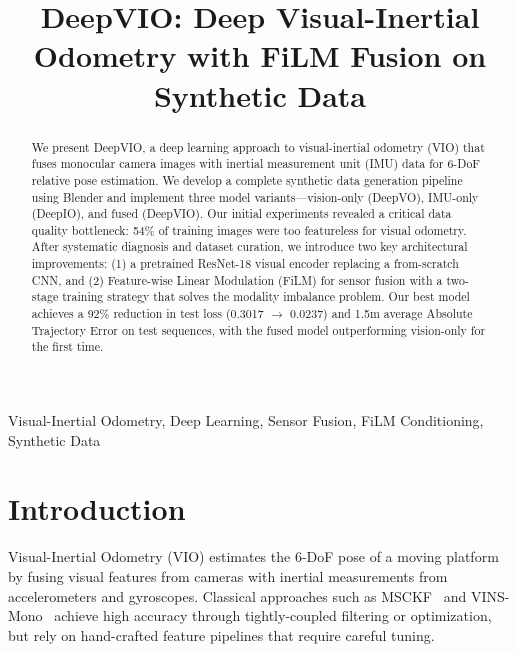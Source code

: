 \documentclass[conference]{IEEEtran}
\begin{document}
\title{DeepVIO: Deep Visual-Inertial Odometry with FiLM Fusion on Synthetic Data}

\author{
}

\maketitle

\begin{abstract}
We present DeepVIO, a deep learning approach to visual-inertial odometry (VIO) that fuses monocular camera images with inertial measurement unit (IMU) data for 6-DoF relative pose estimation. We develop a complete synthetic data generation pipeline using Blender and implement three model variants---vision-only (DeepVO), IMU-only (DeepIO), and fused (DeepVIO). Our initial experiments revealed a critical data quality bottleneck: 54\% of training images were too featureless for visual odometry. After systematic diagnosis and dataset curation, we introduce two key architectural improvements: (1) a pretrained ResNet-18 visual encoder replacing a from-scratch CNN, and (2) Feature-wise Linear Modulation (FiLM) for sensor fusion with a two-stage training strategy that solves the modality imbalance problem. Our best model achieves a 92\% reduction in test loss (0.3017 $\to$ 0.0237) and 1.5m average Absolute Trajectory Error on test sequences, with the fused model outperforming vision-only for the first time.
\end{abstract}

\begin{IEEEkeywords}
Visual-Inertial Odometry, Deep Learning, Sensor Fusion, FiLM Conditioning, Synthetic Data
\end{IEEEkeywords}

\section{Introduction}

Visual-Inertial Odometry (VIO) estimates the 6-DoF pose of a moving platform by fusing visual features from cameras with inertial measurements from accelerometers and gyroscopes. Classical approaches such as MSCKF~\cite{mourikis2007} and VINS-Mono~\cite{qin2018} achieve high accuracy through tightly-coupled filtering or optimization, but rely on hand-crafted feature pipelines that require careful tuning.
\end{document}
